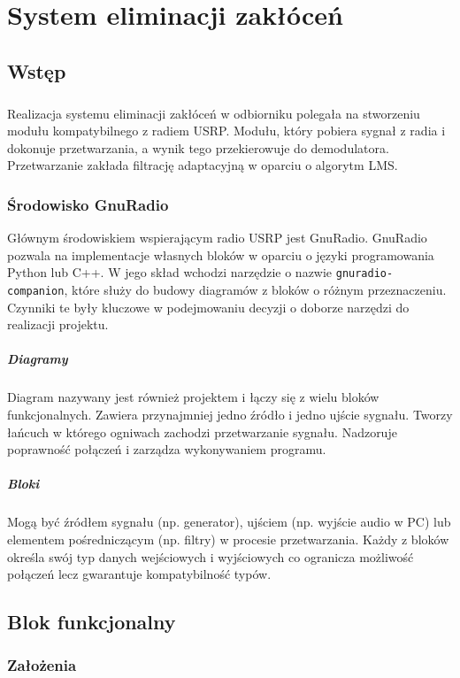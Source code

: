 \chapter{System eliminacji zakłóceń}
\section{Wstęp}
\paragraph{}
Realizacja systemu eliminacji zakłóceń w odbiorniku polegała na stworzeniu modułu kompatybilnego z radiem USRP. Modułu, który pobiera sygnał z radia i dokonuje przetwarzania, a wynik tego przekierowuje do demodulatora.
Przetwarzanie zakłada filtrację adaptacyjną w oparciu o algorytm LMS.
\subsection{Środowisko GnuRadio}
Głównym środowiskiem wspierającym radio USRP jest GnuRadio. GnuRadio pozwala na implementacje własnych bloków w oparciu o języki programowania Python lub C++. W jego skład wchodzi narzędzie o nazwie \texttt{gnuradio-companion}, które służy do budowy diagramów z bloków o różnym przeznaczeniu. Czynniki te były kluczowe w podejmowaniu decyzji o doborze narzędzi do realizacji projektu.
\paragraph*{Diagramy}
    Diagram nazywany jest również projektem i łączy się z wielu bloków funkcjonalnych.
    Zawiera przynajmniej jedno źródło i jedno ujście sygnału.
    Tworzy łańcuch w którego ogniwach zachodzi przetwarzanie sygnału.
    Nadzoruje poprawność połączeń i zarządza wykonywaniem programu.
\paragraph*{Bloki}
    Mogą być źródłem sygnału (np. generator), ujściem (np. wyjście audio w PC) lub elementem pośredniczącym (np. filtry) w procesie przetwarzania. 
    Każdy z bloków określa swój typ danych wejściowych i wyjściowych co ogranicza możliwość połączeń lecz gwarantuje kompatybilność typów.

\section{Blok funkcjonalny}
\subsection{Założenia}
